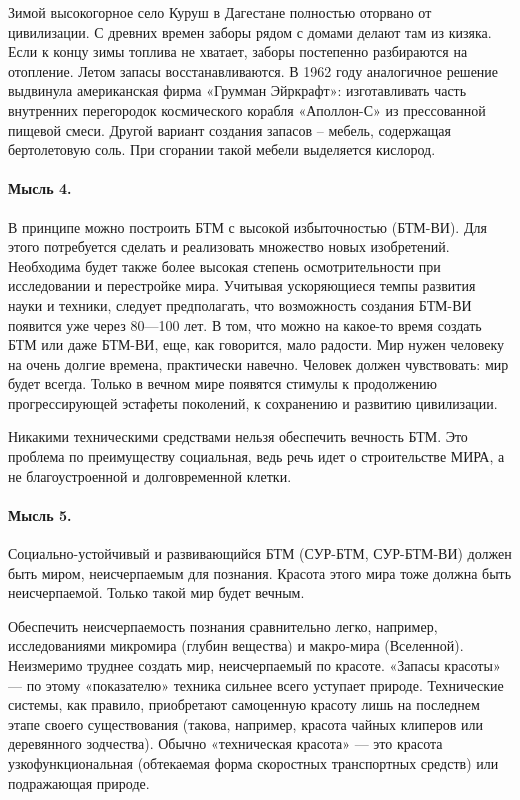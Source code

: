 \documentclass[11pt,a4paper]{article}
\begin{document}
Зимой высокогорное село Куруш в Дагестане полностью оторвано от цивилизации. С
древних времен заборы рядом с домами делают там из кизяка. Если к концу зимы
топлива не хватает, заборы постепенно разбираются на отопление. Летом запасы
восстанавливаются. В 1962 году аналогичное решение выдвинула американская
фирма «Грумман Эйркрафт»: изготавливать часть внутренних перегородок
космического корабля «Аполлон-С» из прессованной пищевой смеси. Другой вариант
создания запасов -- мебель, содержащая бертолетовую соль. При сгорании такой
мебели выделяется кислород.

\paragraph{Мысль 4.}
В принципе можно построить БТМ с высокой избыточностью (БТМ-ВИ). Для этого
потребуется сделать и реализовать множество новых изобретений. Необходима
будет также более высокая степень осмотрительности при исследовании и
перестройке мира. Учитывая ускоряющиеся темпы развития науки и техники,
следует предполагать, что возможность создания БТМ-ВИ появится уже через
80—100 лет. В том, что можно на какое-то время создать БТМ или даже БТМ-ВИ,
еще, как говорится, мало радости. Мир нужен человеку на очень долгие времена,
практически навечно. Человек должен чувствовать: мир будет всегда. Только в
вечном мире появятся стимулы к продолжению прогрессирующей эстафеты поколений,
к сохранению и развитию цивилизации.

Никакими техническими средствами нельзя обеспечить вечность БТМ. Это проблема
по преимуществу социальная, ведь речь идет о строительстве МИРА, а не
благоустроенной и долговременной клетки.

\paragraph{Мысль 5.}
Социально-устойчивый и развивающийся БТМ (СУР-БТМ, СУР-БТМ-ВИ) должен быть
миром, неисчерпаемым для познания. Красота этого мира тоже должна быть
неисчерпаемой. Только такой мир будет вечным.

Обеспечить неисчерпаемость познания сравнительно легко, например,
исследованиями микромира (глубин вещества) и макро-мира (Вселенной).
Неизмеримо труднее создать мир, неисчерпаемый по красоте. «Запасы красоты» —
по этому «показателю» техника сильнее всего уступает природе. Технические
системы, как правило, приобретают самоценную красоту лишь на последнем этапе
своего существования (такова, например, красота чайных клиперов или
деревянного зодчества). Обычно «техническая красота» — это красота
узкофункциональная (обтекаемая форма скоростных транспортных средств) или
подражающая природе.
\end{document}
